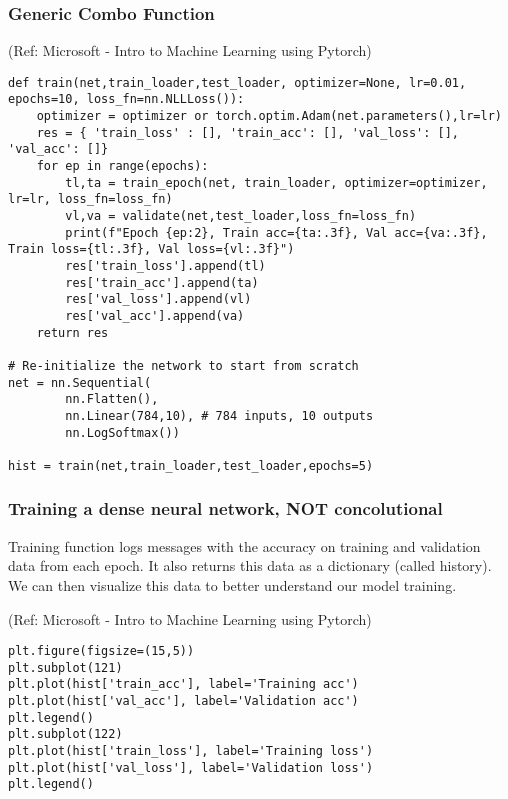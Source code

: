 \begin{frame}[fragile] \frametitle{Generic Combo Function}

\tiny{(Ref: Microsoft - Intro to Machine Learning using Pytorch)}


\begin{lstlisting}
def train(net,train_loader,test_loader, optimizer=None, lr=0.01, epochs=10, loss_fn=nn.NLLLoss()):
    optimizer = optimizer or torch.optim.Adam(net.parameters(),lr=lr)
    res = { 'train_loss' : [], 'train_acc': [], 'val_loss': [], 'val_acc': []}
    for ep in range(epochs):
        tl,ta = train_epoch(net, train_loader, optimizer=optimizer, lr=lr, loss_fn=loss_fn)
        vl,va = validate(net,test_loader,loss_fn=loss_fn)
        print(f"Epoch {ep:2}, Train acc={ta:.3f}, Val acc={va:.3f}, Train loss={tl:.3f}, Val loss={vl:.3f}")
        res['train_loss'].append(tl)
        res['train_acc'].append(ta)
        res['val_loss'].append(vl)
        res['val_acc'].append(va)
    return res

# Re-initialize the network to start from scratch
net = nn.Sequential(
        nn.Flatten(), 
        nn.Linear(784,10), # 784 inputs, 10 outputs
        nn.LogSoftmax())

hist = train(net,train_loader,test_loader,epochs=5)		
\end{lstlisting}


\end{frame}

\begin{frame}[fragile] \frametitle{Training a dense neural network, NOT concolutional}

Training function logs messages with the accuracy on training and validation data from each epoch. It also returns this data as a dictionary (called history). We can then visualize this data to better understand our model training.

\tiny{(Ref: Microsoft - Intro to Machine Learning using Pytorch)}


\begin{lstlisting}
plt.figure(figsize=(15,5))
plt.subplot(121)
plt.plot(hist['train_acc'], label='Training acc')
plt.plot(hist['val_acc'], label='Validation acc')
plt.legend()
plt.subplot(122)
plt.plot(hist['train_loss'], label='Training loss')
plt.plot(hist['val_loss'], label='Validation loss')
plt.legend()
\end{lstlisting}


\end{frame}



